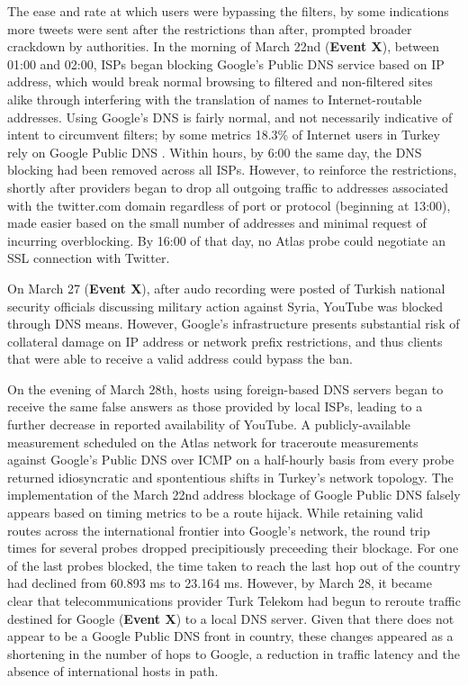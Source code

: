 The ease and rate at which users were bypassing the filters, by some indications more tweets were sent after the restrictions than after, prompted broader crackdown by authorities. In the morning of March 22nd (\textbf{Event X}), between 01:00 and 02:00, ISPs began blocking Google's Public DNS service based on IP address, which would break normal browsing to filtered and non-filtered sites alike through interfering with the translation of names to Internet-routable addresses. Using Google's DNS is fairly normal, and not necessarily indicative of intent to circumvent filters; by some metrics 18.3\% of Internet users in Turkey rely on Google Public DNS \cite{ispcolumn2013googledns}. Within hours, by 6:00 the same day, the DNS blocking had been removed across all ISPs. However, to reinforce the restrictions, shortly after providers began to drop all outgoing traffic to addresses associated with the twitter.com domain regardless of port or protocol (beginning at 13:00), made easier based on the small number of addresses and minimal request of incurring overblocking. By 16:00 of that day, no Atlas probe could negotiate an SSL connection with Twitter.

On March 27 (\textbf{Event X}), after audo recording were posted of Turkish national security officials discussing military action against Syria, YouTube was blocked through DNS means. However, Google's infrastructure presents substantial risk of collateral damage on IP address or network prefix restrictions, and thus clients that were able to receive a valid address could bypass the ban.

On the evening of March 28th, hosts using foreign-based DNS servers began to receive the same false answers as those provided by local ISPs, leading to a further decrease in reported availability of YouTube. A publicly-available measurement scheduled on the Atlas network for traceroute measurements against Google's Public DNS over ICMP on a half-hourly basis from every probe returned idiosyncratic and spontentious shifts in Turkey's network topology. The implementation of the March 22nd address blockage of Google Public DNS falsely appears based on timing metrics to be a route hijack. While retaining valid routes across the international frontier into Google's network, the round trip times for several probes dropped precipitiously preceeding their blockage. For one of the last probes blocked, the time taken to reach the last hop out of the country had declined from 60.893 ms to 23.164 ms. However, by March 28, it became clear that telecommunications provider Turk Telekom had begun to reroute traffic destined for Google (\textbf{Event X}) to a local DNS server. Given that there does not appear to be a Google Public DNS front in country, these changes appeared as a shortening in the number of hops to Google, a reduction in traffic latency and the absence of international hosts in path.

